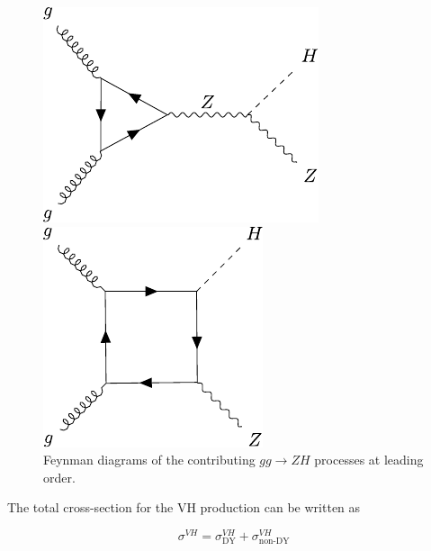 \begin{figure}[h!]
	\centering
	\begin{minipage}{.5\textwidth}
		\centering
		\includegraphics[width=0.8\linewidth]{figures/theory/diagrams/ggVH_triangle.pdf}
	\end{minipage}%
	\begin{minipage}{.5\textwidth}
		\centering
		\includegraphics[width=0.6\linewidth]{figures/theory/diagrams/ggZH_box.pdf}
	\end{minipage}
	\caption{Feynman diagrams of the contributing $gg\rightarrow ZH$ processes at leading order.}
	\label{fig:VH_diagrams}
\end{figure}

The total cross-section for the VH production can be written as

\begin{equation*}
	\sigma^{VH} = \sigma^{VH}_\text{DY} + \sigma^{VH}_\text{non-DY}
\end{equation*}


